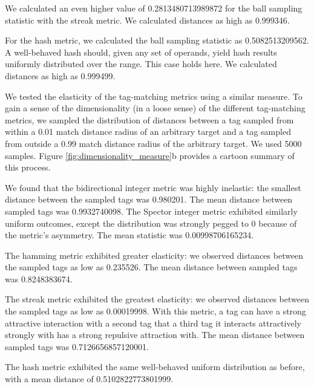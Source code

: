 We calculated an even higher value of 0.2813480713989872 for the ball sampling statistic with the streak metric.
We calculated distances as high as 0.999346.

For the hash metric, we calculated the ball sampling statistic as 0.5082513209562.
A well-behaved hash should, given any set of operands, yield hash results uniformly distributed over the range.
This case holds here.
We calculated distances as high as 0.999499.



We tested the elasticity of the tag-matching metrics using a similar measure.
To gain a sense of the dimensionality (in a loose sense) of the different tag-matching metrics, we sampled the distribution of distances between a tag sampled from within a 0.01 match distance radius of an arbitrary target and a tag sampled from outside a 0.99 match distance radius of the arbitrary target.
We used 5000 samples.
Figure \ref{fig:dimensionality_measure}b provides a cartoon summary of this process.

We found that the bidirectional integer metric was highly inelastic: the smallest distance between the sampled tags was 0.980201.
The mean distance between sampled tags was 0.9932740098.
The Spector integer metric exhibited similarly uniform outcomes, except the distribution was strongly pegged to 0 because of the metric's asymmetry.
The mean statistic was 0.00998706165234.

The hamming metric exhibited greater elasticity: we observed distances between the sampled tags as low as 0.235526.
The mean distance between sampled tags was 0.8248383674.

The streak metric exhibited the greatest elasticity: we observed distances between the sampled tags as low as 0.00019998.
With this metric, a tag can have a strong attractive interaction with a second tag that a third tag it interacts attractively strongly with has a strong repulsive attraction with.
The mean distance between sampled tags was 0.7126656857120001.

The hash metric exhibited the same well-behaved uniform distribution as before, with a mean distance of 0.5102822773801999.

